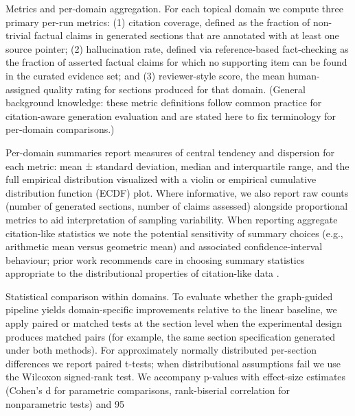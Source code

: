 \documentclass{article}%
\begin{document}
Metrics and per-domain aggregation. For each topical domain we compute three primary per-run metrics: (1) citation coverage, defined as the fraction of non-trivial factual claims in generated sections that are annotated with at least one source pointer; (2) hallucination rate, defined via reference-based fact-checking as the fraction of asserted factual claims for which no supporting item can be found in the curated evidence set; and (3) reviewer-style score, the mean human-assigned quality rating for sections produced for that domain. (General background knowledge: these metric definitions follow common practice for citation-aware generation evaluation and are stated here to fix terminology for per-domain comparisons.)

Per-domain summaries report measures of central tendency and dispersion for each metric: mean ± standard deviation, median and interquartile range, and the full empirical distribution visualized with a violin or empirical cumulative distribution function (ECDF) plot. Where informative, we also report raw counts (number of generated sections, number of claims assessed) alongside proportional metrics to aid interpretation of sampling variability. When reporting aggregate citation-like statistics we note the potential sensitivity of summary choices (e.g., arithmetic mean versus geometric mean) and associated confidence-interval behaviour; prior work recommends care in choosing summary statistics appropriate to the distributional properties of citation-like data \cite{web_thelwall_2015_the_precision_of_the_arithmetic_mean_geometric_m}.

Statistical comparison within domains. To evaluate whether the graph-guided pipeline yields domain-specific improvements relative to the linear baseline, we apply paired or matched tests at the section level when the experimental design produces matched pairs (for example, the same section specification generated under both methods). For approximately normally distributed per-section differences we report paired t-tests; when distributional assumptions fail we use the Wilcoxon signed-rank test. We accompany p-values with effect-size estimates (Cohen's d for parametric comparisons, rank-biserial correlation for nonparametric tests) and 95%
\end{document}

